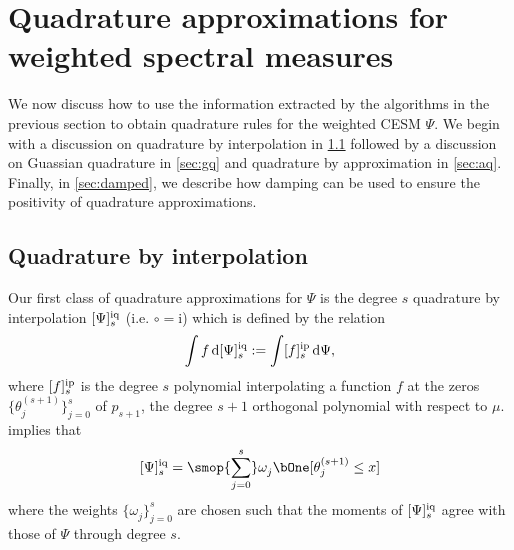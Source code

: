 \section{Quadrature approximations for weighted spectral measures}
\label{sec:quadrature}

We now discuss how to use the information extracted by the algorithms in the previous section to obtain quadrature rules for the weighted CESM \( \Psi \).
We begin with a discussion on quadrature by interpolation in \cref{sec:iq} followed by a discussion on Guassian quadrature in \cref{sec:gq} and quadrature by approximation in \cref{sec:aq}.
Finally, in \cref{sec:damped}, we describe how damping can be used to ensure the positivity of quadrature approximations.

\subsection{Quadrature by interpolation}
\label{sec:iq}

Our first class of quadrature approximations for \( \Psi \) is the degree \( s \) quadrature by interpolation \( \qq[i]{\Psi}{s} \) (i.e. $\circ = \textrm{i}$) which is defined by the relation
\begin{equation}
    \label{eqn:interp_f}
    \int f \,\d\qq[i]{\Psi}{s}
    := \int \ff[i]{f}{s} \,\d\Psi,
\end{equation}
where \( \ff[i]{f}{s} \) is the degree \( s \) polynomial interpolating a function \( f \) at the zeros \( \{\theta_{j}^{(s+1)}\}_{j=0}^{s} \) of \( p_{s+1} \), the degree $s+1$ orthogonal polynomial with respect to \( \mu \).
 implies that
\begin{equation*}
    \qq[i]{\Psi}{s} = \smop{\sum_{j=0}^{s}} \omega_{j}^{} \bOne [\theta_{j}^{(s+1)} \leq x ]
\end{equation*}
where the weights \( \{ \omega_{j}^{} \}_{j=0}^{s} \) are chosen such that the moments of \( \qq[i]{\Psi}{s} \) agree with those of \( \Psi \) through degree \( s \).


